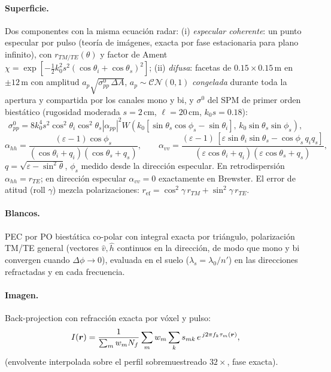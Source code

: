 \paragraph{Superficie.} Dos componentes con la misma ecuación radar:
(i) \emph{especular coherente}: un punto especular por pulso (teoría de
imágenes, exacta por fase estacionaria para plano infinito), con
$r_{TM/TE}(\theta)$ y factor de Ament $\chi=\exp[-\tfrac12k_0^2s^2(\cos\theta_i+\cos\theta_s)^2]$;
(ii) \emph{difusa}: facetas de $0.15\times0.15$\,m en $\pm12$\,m con amplitud
$a_p\sqrt{\sigma^0_{pp}\,\Delta A}$, $a_p\sim\mathcal{CN}(0,1)$ \emph{congelada}
durante toda la apertura y compartida por los canales mono y bi, y
$\sigma^0$ del SPM de primer orden biestático (rugosidad moderada $s=2$\,cm,
$\ell=20$\,cm, $k_0s=0.18$):
\begin{equation}
  \sigma^0_{pp} = 8k_0^4s^2\cos^2\theta_i\cos^2\theta_s|\alpha_{pp}|^2
  W(k_0[\sin\theta_s\cos\phi_s-\sin\theta_i],\,k_0\sin\theta_s\sin\phi_s),
\end{equation}
\begin{equation}
  \alpha_{hh}=\frac{(\varepsilon-1)\cos\phi_s}{(\cos\theta_i+q_i)(\cos\theta_s+q_s)},\qquad
  \alpha_{vv}=\frac{(\varepsilon-1)\,[\varepsilon\sin\theta_i\sin\theta_s-\cos\phi_s\,q_iq_s]}
                  {(\varepsilon\cos\theta_i+q_i)(\varepsilon\cos\theta_s+q_s)},
  \label{eq:spm}
\end{equation}
$q=\sqrt{\varepsilon-\sin^2\theta}$, $\phi_s$ medido desde la dirección especular.
En retrodispersión $\alpha_{hh}=r_{TE}$; en dirección especular $\alpha_{vv}=0$
exactamente en Brewster. El error de atitud (roll $\gamma$) mezcla
polarizaciones: $r_{\mathrm{ef}}=\cos^2\gamma\,r_{TM}+\sin^2\gamma\,r_{TE}$.

\paragraph{Blancos.} PEC por PO biestática co-polar con integral exacta por
triángulo, polarización TM/TE general (vectores $\hat v,\hat h$ continuos en
la dirección, de modo que mono y bi convergen cuando $\Delta\phi\to0$),
evaluada en el suelo ($\lambda_s=\lambda_0/n'$) en las direcciones refractadas
y en cada frecuencia.

\paragraph{Imagen.} Back-projection con refracción exacta por vóxel y pulso:
\begin{equation}
  I(\bm{r}) = \frac{1}{\sum_m w_m N_f}\sum_m w_m\sum_k s_{mk}\,e^{\,j2\pi f_k\tau_m(\bm{r})} ,
\end{equation}
(envolvente interpolada sobre el perfil sobremuestreado $32\times$, fase exacta).

